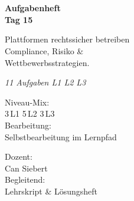 \documentclass[11pt,a4paper,oneside]{article}
\newcommand{\caveatfontfallback}{\itshape}
\newcommand\caveatfont{\caveatfontfallback}%
\begin{document}
\begin{titlepage}
  \pagestyle{empty}
  \vspace*{1.5cm}
  \\[2pt]
  \noindent{\color{lpAccent}\rule{\linewidth}{1.2pt}}\\[4pt]

  \vspace{3cm}
  {\sffamily\fontsize{30}{34}\selectfont\bfseries\color{lpInk}Aufgabenheft\\Tag 15\par}

  \vspace{0.7cm}
  {\sffamily\large\color{lpGray}Plattformen rechtssicher betreiben \textendash{}\\Compliance, Risiko \&\\Wettbewerbsstrategien.\par}

  \vspace{1.5cm}
  {\caveatfont\LARGE\color{lpAmber}11 Aufgaben \textperiodcentered{} L1 \textperiodcentered{} L2 \textperiodcentered{} L3}\par

  \vfill

  \noindent\begin{minipage}{0.55\linewidth}
    {\sffamily\footnotesize\color{lpGray}Niveau-Mix:}\\
    {\sffamily\small\color{lpInk}3\,\textsf{L1} \textperiodcentered{} 5\,\textsf{L2} \textperiodcentered{} 3\,\textsf{L3}}\\[10pt]
    {\sffamily\footnotesize\color{lpGray}Bearbeitung:}\\
    {\sffamily\small\color{lpInk}Selbstbearbeitung im Lernpfad}
  \end{minipage}\hfill
  \begin{minipage}{0.4\linewidth}
    \raggedleft
    {\sffamily\footnotesize\color{lpGray}Dozent:}\\
    {\sffamily\small\color{lpInk}Can Siebert}\\[10pt]
    {\sffamily\footnotesize\color{lpGray}Begleitend:}\\
    {\sffamily\small\color{lpInk}Lehrskript \& Lösungsheft}
  \end{minipage}

  \vspace{0.5cm}
  \noindent{\color{lpAccent}\rule{\linewidth}{0.6pt}}
\end{titlepage}
\end{document}
